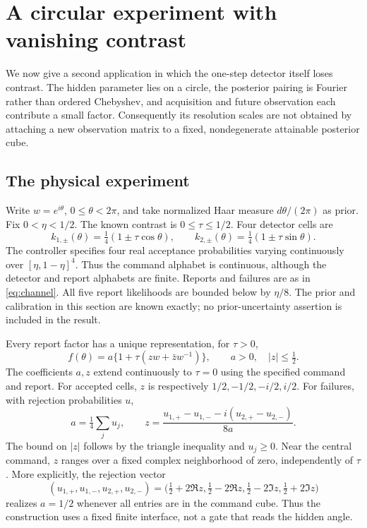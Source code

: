 \documentclass[11pt]{amsart}
\theoremstyle{definition}\newtheorem{definition}[theorem]{Definition}
\theoremstyle{remark}\newtheorem{remark}[theorem]{Remark}
\begin{document}
\section{A circular experiment with vanishing contrast}
\label{sec:circular}
We now give a second application in which the one-step detector itself
loses contrast. The hidden parameter lies on a circle, the posterior
pairing is Fourier rather than ordered Chebyshev, and acquisition and
future observation each contribute a small factor. Consequently its
resolution scales are not obtained by attaching a new observation
matrix to a fixed, nondegenerate attainable posterior cube.

\subsection{The physical experiment}
Write $w=e^{i\theta}$, $0\le\theta<2\pi$, and take normalized Haar
measure $d\theta/(2\pi)$ as prior. Fix $0<\eta<1/2$. The known
contrast is $0\le\tau\le1/2$. Four detector cells are
\begin{equation}\label{eq:circle-cells}
 k_{1,\pm}(\theta)=\tfrac14(1\pm\tau\cos\theta),\qquad
 k_{2,\pm}(\theta)=\tfrac14(1\pm\tau\sin\theta).
\end{equation}
The controller specifies four real acceptance probabilities varying
continuously over $[\eta,1-\eta]^4$. Thus the command alphabet is
continuous, although the detector and report alphabets are finite. Reports and failures are as in
\eqref{eq:channel}. All five report likelihoods are bounded below by
$\eta/8$. The prior and calibration in this section are known exactly;
no prior-uncertainty assertion is included in the result.

Every report factor has a unique representation, for $\tau>0$,
\begin{equation}\label{eq:circle-factor}
 f(\theta)=a\{1+\tau(z w+\bar z w^{-1})\},
 \qquad a>0,\quad |z|\le\tfrac12.
\end{equation}
The coefficients $a,z$ extend continuously to $\tau=0$ using the
specified command and report. For accepted cells, $z$ is respectively
$1/2,-1/2,-i/2,i/2$. For failures, with rejection probabilities $u$,
\begin{equation}\label{eq:circle-command-coordinates}
 a=\tfrac14\sum_j u_j,\qquad
 z=\frac{u_{1,+}-u_{1,-}-i(u_{2,+}-u_{2,-})}{8a}.
\end{equation}
The bound on $|z|$ follows by the triangle inequality and $u_j\ge0$.
Near the central command, $z$ ranges over a fixed complex neighborhood
of zero, independently of $\tau$. More explicitly, the rejection vector
\begin{equation}\label{eq:circle-right-inverse}
 (u_{1,+},u_{1,-},u_{2,+},u_{2,-})
 =\bigl(\tfrac12+2\Re z,\tfrac12-2\Re z,
        \tfrac12-2\Im z,\tfrac12+2\Im z\bigr)
\end{equation}
realizes $a=1/2$ whenever all entries are in the command cube.
Thus the construction uses a fixed finite interface, not a gate that
reads the hidden angle.
\end{document}
